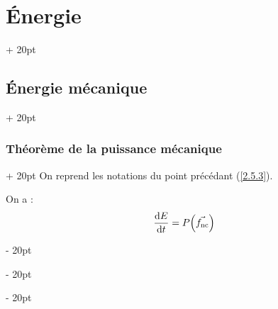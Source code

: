 \documentclass[a4paper, 12pt, twoside]{article}
\newcommand{\dt}[2][t]{\dfrac{\mathrm d #2}{\mathrm d #1}} %
\newcommand{\lr}[1]{\left( #1 \right)}
\newcommand{\ind}[1][20pt]{\advance\leftskip + #1}
\newcommand{\deind}[1][20pt]{\advance\leftskip - #1}
\newenvironment{indt}[2][20pt]{#2 \par \ind[#1]}{\par \deind} %
\begin{document}
\begin{indt}{\section{\'Energie}}
\begin{indt}{\subsection{Énergie mécanique}}
            \vspace{12pt}
            
            \begin{indt}{\subsubsection{Théorème de la puissance mécanique}}
                On reprend les notations du point précédant (\ref{2.5.3}).

                On a :
                \[
                    \dt E = P\!\lr{\vec{f_{\rm nc}}}
                \]
            \end{indt}
        \end{indt}
    \end{indt}

    \vspace{12pt}
    
\end{document}
